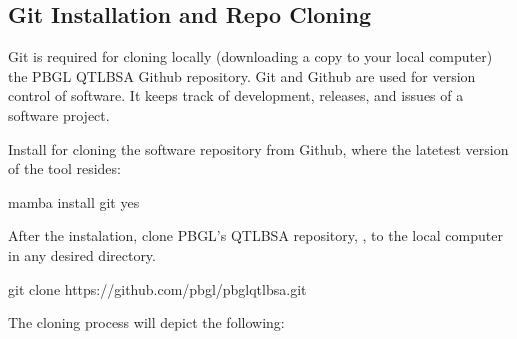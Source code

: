 \documentclass[letterpaper,10pt,english]{sphinxhowto}
\begin{document}
\subsection{Git Installation and Repo Cloning}
\label{\detokenize{index:git-installation-and-repo-cloning}}
\sphinxAtStartPar
Git is required for cloning locally (downloading a copy to your local computer) the PBGL QTL\sphinxhyphen{}BSA Github repository. Git and Github are used for version control of software. It keeps track of development, releases, and issues of a software project.

\sphinxAtStartPar
Install  for cloning the  software repository from Github, where the latetest version of the tool resides:

\begin{sphinxVerbatim}[commandchars=\\\{\}]
\PYGZdl{} mamba install git \PYGZhy{}\PYGZhy{}yes
\end{sphinxVerbatim}

\sphinxAtStartPar
After the instalation, clone PBGL’s QTL\sphinxhyphen{}BSA repository, , to the local computer in any desired directory.

\begin{sphinxVerbatim}[commandchars=\\\{\}]
\PYGZdl{} git clone https://github.com/pbgl/pbgl\PYGZhy{}qtl\PYGZhy{}bsa.git
\end{sphinxVerbatim}

\sphinxAtStartPar
The cloning process will depict the following:
\end{document}
